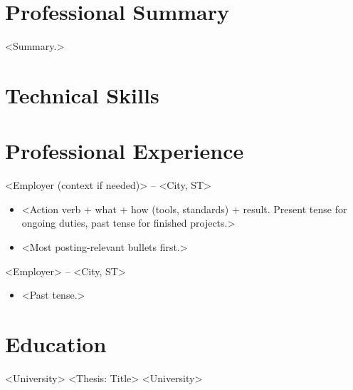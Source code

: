 \documentclass{resume}
\begin{document}
\makeheader

\section*{Professional Summary}
<Summary.>

\section*{Technical Skills}

\section*{Professional Experience}
     {<Employer (context if needed)> -- <City, ST>}
\begin{itemize}
  \item <Action verb + what + how (tools, standards) + result. Present tense for ongoing duties, past tense for finished projects.>
  \item <Most posting-relevant bullets first.>
\end{itemize}


     {<Employer> -- <City, ST>}
\begin{itemize}
  \item <Past tense.>
\end{itemize}

\section*{Education}
       {<University>}
       {<Thesis: Title>}
       {<University>}
       {}
\end{document}
